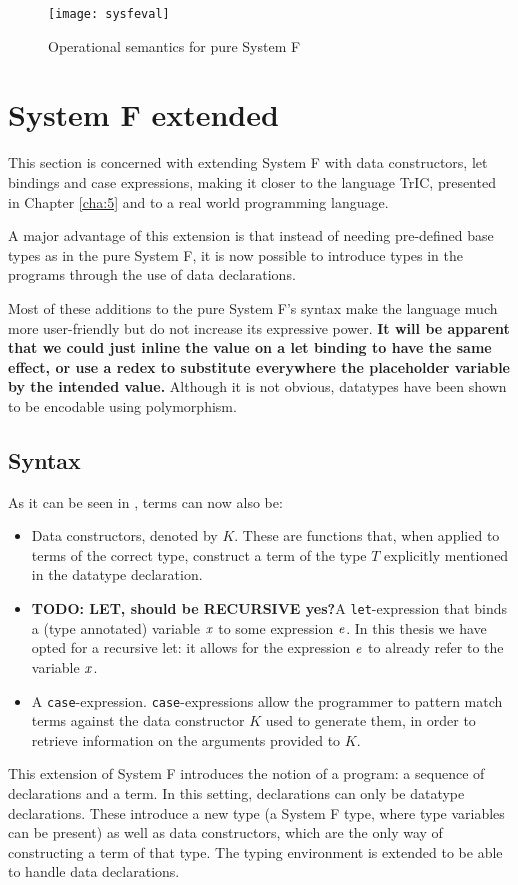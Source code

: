 \begin{figure}
  \centering
  \texttt{[image: sysfeval]}
  \caption{Operational semantics for pure System F}
  \label{sysfeval}
\end{figure}


\section{System F extended}
This section is concerned with extending System F with data constructors, let bindings and case expressions, making it closer to the language TrIC, presented in Chapter \ref{cha:5} and to a real world programming language.

A major advantage of this extension is that instead of needing pre-defined base types as in the pure System F, it is now possible to introduce types in the programs through the use of data declarations.

Most of these additions to the pure System F's syntax make the language much more user-friendly but do not increase its expressive power. \textbf{It will be apparent that we could just inline the value on a let binding to have the same effect, or use a redex to substitute everywhere the placeholder variable by the intended value.} Although it is not obvious, datatypes have been shown to be encodable using polymorphism.

\subsection{Syntax}
As it can be seen in , terms can now also be:
\begin{itemize}
\item Data constructors, denoted by $K$. These are functions that, when applied to terms of the correct type, construct a term of the type $T$ explicitly mentioned in the datatype declaration.
\item \textbf{TODO: LET, should be RECURSIVE yes?}A \texttt{let}-expression that binds a (type annotated) variable $\mathit{x}$ to some expression $\mathit{e}$. In this thesis we have opted for a recursive let: it allows for the expression $\mathit{e}$ to already refer to the variable $\mathit{x}$.
\item A \texttt{case}-expression. \texttt{case}-expressions allow the programmer to pattern match terms against the data constructor $K$ used to generate them, in order to retrieve information on the arguments provided to $K$.
\end{itemize}
This extension of System F introduces the notion of a program: a sequence of declarations and a term. In this setting, declarations can only be datatype declarations. These introduce a new type (a System F type, where type variables can be present) as well as data constructors, which are the only way of constructing a term of that type. The typing environment is extended to be able to handle data declarations.


